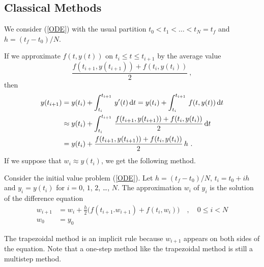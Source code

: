 \subsection{Classical Methods}

We consider (\ref{ODE}) with the usual partition
$t_0 < t_1 < \ldots < t_N = t_f$ and $h=(t_f-t_0)/N$.

If we approximate $f(t, y(t))$ on $t_i \leq t \leq t_{i+1}$ by the
average value
\[
\frac{f(t_{i+1},y(t_{i+1})) + f(t_i,y(t_i))}{2} \ ,
\]
then
\begin{align*}
y(t_{i+1}) &= y(t_i) + \int_{t_i}^{t_{i+1}}\,y'(t) \,\mathrm{d}t
= y(t_i) + \int_{t_i}^{t_{i+1}}\,f(t,y(t)) \,\mathrm{d}t \\
&\approx y(t_i) + \int_{t_i}^{t_{i+1}}\,
\frac{f(t_{i+1},y(t_{i+1})) + f(t_i,y(t_i)) }{2} \,\mathrm{d}t \\
&= y(t_i) + \frac{f(t_{i+1},y(t_{i+1})) + f(t_i,y(t_i)) }{2}\,h \ .
\end{align*}
If we suppose that $w_i \approx y(t_i)$, we get the following method.

\begin{defn} \label{trapmethdef}
Consider the initial value problem (\ref{ODE}).
Let $h=(t_f-t_0)/N$, $t_i=t_0+ih$ and $y_i = y(t_i)$ for $i=0$,
$1$, $2$, \ldots, $N$.  The approximation $w_i$ of $y_i$ is the
solution of the difference equation
\begin{align*}
w_{i+1} & = w_i + \frac{h}{2} \big( f(t_{i+1}.w_{i+1}) + f(t_i,w_i)
\big) \quad, \quad 0 \leq i < N \\
w_0 &= y_0
\end{align*}
\end{defn}

The trapezoidal method is an implicit rule because $w_{i+1}$ appears
on both sides of the equation.   Note that a one-step method like the
trapezoidal method is still a multistep method.

